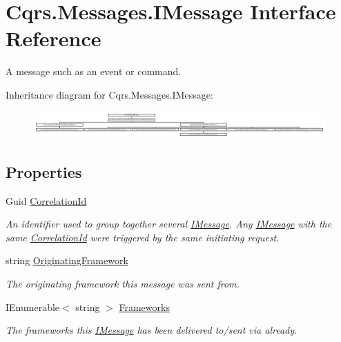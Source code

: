 \hypertarget{interfaceCqrs_1_1Messages_1_1IMessage}{}\section{Cqrs.\+Messages.\+I\+Message Interface Reference}
\label{interfaceCqrs_1_1Messages_1_1IMessage}


A message such as an event or command.  


Inheritance diagram for Cqrs.\+Messages.\+I\+Message\+:\begin{figure}[H]
\begin{center}
\leavevmode
\includegraphics[height=1.041667cm]{interfaceCqrs_1_1Messages_1_1IMessage}
\end{center}
\end{figure}
\subsection*{Properties}
\begin{DoxyCompactItemize}
\item 
Guid \hyperlink{interfaceCqrs_1_1Messages_1_1IMessage_a9037d871a75ac76b190130aa56fe63a8_a9037d871a75ac76b190130aa56fe63a8}{Correlation\+Id}
\begin{DoxyCompactList}\small\item\em An identifier used to group together several \hyperlink{interfaceCqrs_1_1Messages_1_1IMessage}{I\+Message}. Any \hyperlink{interfaceCqrs_1_1Messages_1_1IMessage}{I\+Message} with the same \hyperlink{interfaceCqrs_1_1Messages_1_1IMessage_a9037d871a75ac76b190130aa56fe63a8_a9037d871a75ac76b190130aa56fe63a8}{Correlation\+Id} were triggered by the same initiating request. \end{DoxyCompactList}\item 
string \hyperlink{interfaceCqrs_1_1Messages_1_1IMessage_aff9a2d35971384fb440954c3163eaeef_aff9a2d35971384fb440954c3163eaeef}{Originating\+Framework}
\begin{DoxyCompactList}\small\item\em The originating framework this message was sent from. \end{DoxyCompactList}\item 
I\+Enumerable$<$ string $>$ \hyperlink{interfaceCqrs_1_1Messages_1_1IMessage_af147de5bb9a480ba75b5bb9f0ef12132_af147de5bb9a480ba75b5bb9f0ef12132}{Frameworks}
\begin{DoxyCompactList}\small\item\em The frameworks this \hyperlink{interfaceCqrs_1_1Messages_1_1IMessage}{I\+Message} has been delivered to/sent via already. \end{DoxyCompactList}\end{DoxyCompactItemize}


